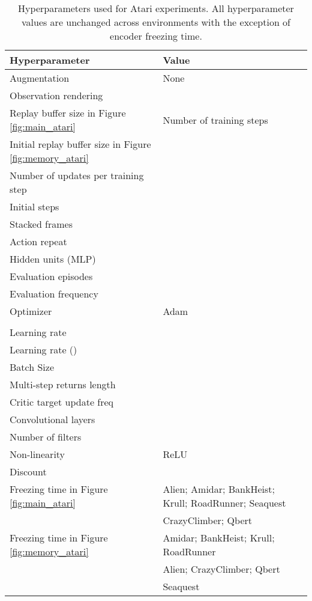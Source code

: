 \documentclass{article}
\begin{document}
\begin{table*}[ht]
\caption{Hyperparameters used for Atari experiments. All hyperparameter values are unchanged across environments with the exception of encoder freezing time.}
\vskip 0.15in
\begin{center}
\begin{small}
\begin{tabular}{ll}
\toprule
\textbf{Hyperparameter} & \textbf{Value}  \\
\midrule
Augmentation    & None  \\ 
Observation rendering    &   \\ 
Replay buffer size in Figure \ref{fig:main_atari}   & Number of training steps \\ 
Initial replay buffer size in Figure \ref{fig:memory_atari}  &  \\
Number of updates per training step  &  \\
Initial steps    &   \\ 
Stacked frames    &   \\ 
Action repeat    &  \\
Hidden units (MLP)    &   \\ 
Evaluation episodes    &   \\ 
Evaluation frequency    &   \\ 
Optimizer    & Adam  \\ 
   &   \\
Learning rate  
&  \\ 
Learning rate () &  \\
Batch Size    &    \\ 
Multi-step returns length &  \\
Critic target update freq &  \\
Convolutional layers &  \\
Number of filters &  \\
Non-linearity & ReLU \\
Discount  &  \\
Freezing time  in Figure \ref{fig:main_atari} 
 &  Alien; Amidar; BankHeist; Krull; RoadRunner; Seaquest \\
 &  CrazyClimber; Qbert \\
Freezing time  in Figure \ref{fig:memory_atari} 
 &  Amidar; BankHeist; Krull; RoadRunner \\
 &  Alien; CrazyClimber; Qbert \\
 &  Seaquest  \\
\bottomrule
\end{tabular}
\end{small}
\label{tbl:atari_hyperparameters}
\end{center}
\vskip -0.1in
\end{table*} 
\end{document}
